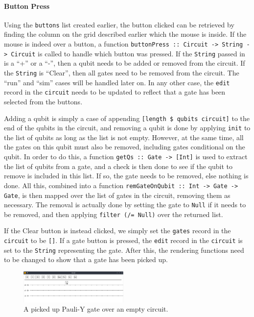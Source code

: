 \documentclass[a4paper,10pt, titlepage, twoside]{article}
\begin{document}
\paragraph{Button Press}
Using the \texttt{buttons} list created earlier, the button clicked can be retrieved by finding the column on the grid described earlier which the mouse is inside. If the mouse is indeed over a button, a function \texttt{buttonPress :: Circuit -> String -> Circuit} is called to handle which button was pressed. If the \texttt{String} passed in is a ``+'' or a ``-'', then a qubit needs to be added or removed from the circuit. If the \texttt{String} is ``Clear'', then all gates need to be removed from the circuit. The ``run'' and ``sim'' cases will be handled later on. In any other case, the \texttt{edit} record in the \texttt{circuit} needs to be updated to reflect that a gate has been selected from the buttons.\par
Adding a qubit is simply a case of appending \texttt{[length \$ qubits circuit]} to the end of the qubits in the circuit, and removing a qubit is done by applying \texttt{init} to the list of qubits as long as the list is not empty. However, at the same time, all the gates on this qubit must also be removed, including gates conditional on the qubit. In order to do this, a function \texttt{getQs :: Gate -> [Int]} is used to extract the list of qubits from a gate, and a check is then done to see if the qubit to remove is included in this list. If so, the gate needs to be removed, else nothing is done. All this, combined into a function \texttt{remGateOnQubit :: Int -> Gate -> Gate}, is then mapped over the list of gates in the circuit, removing them as necessary. The removal is actually done by setting the gate to \texttt{Null} if it needs to be removed, and then applying \texttt{filter (/= Null)} over the returned list.\par
If the Clear button is instead clicked, we simply set the \texttt{gates} record in the \texttt{circuit} to be \texttt{[]}. If a gate button is pressed, the \texttt{edit} record in the \texttt{circuit} is set to the \texttt{String} representing the gate. After this, the rendering functions need to be changed to show that a gate has been picked up.\par
\begin{figure}
    \centering
    \includegraphics[width=0.48\textwidth]{pickupgate}
    \caption{A picked up Pauli-Y gate over an empty circuit.}
\end{figure}
\end{document}
